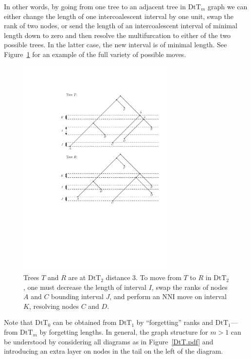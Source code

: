 \documentclass{amsart}
\theoremstyle{definition}
\newcommand{\dtt}{\mathrm{DtT}}
\begin{document}
In other words, by going from one tree to an adjacent tree in $\dtt_m$ graph we can either change the length of one intercoalescent interval by one unit, swap the rank of two nodes, or send the length of an intercoalescent interval of minimal length down to zero and then resolve the multifurcation to either of the two possible trees.
In the latter case, the new interval is of minimal length.
See Figure~\ref{dts_neighbors.pdf} for an example of the full variety of possible moves.

\begin{figure}[ht]
\centering
\includegraphics[width=0.7\textwidth]{dts_neighbors.pdf}
\caption{Trees $T$ and $R$ are at $\dtt_2$ distance $3$.
To move from $T$ to $R$ in $\dtt_2$, one must decrease the length of interval $I$, swap the ranks of nodes $A$ and $C$ bounding interval $J$, and perform an NNI move on interval $K$, resolving nodes $C$ and $D$.}
\label{dts_neighbors.pdf}
\end{figure}

Note that $\dtt_0$ can be obtained from $\dtt_1$ by ``forgetting'' ranks and $\dtt_1$---from $\dtt_m$ by forgetting lengths.
In general, the graph structure for $m > 1$ can be understood by considering all diagrams as in Figure~\ref{DtT.pdf} and introducing an extra layer on nodes in the tail on the left of the diagram.
\end{document}
